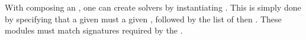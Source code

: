 

With \bothmodules{} composing an \as, one can create solvers by instantiating \ms. This is simply done by specifying that a given \mbox{} must \mbox{} a given \as, followed by the list of \omprefix{} then \opchs{}. These modules must match signatures required by the \as. 

